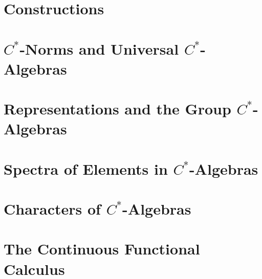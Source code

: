 \section{Constructions}%
\section{$C^{\ast}$-Norms and Universal $C^{\ast}$-Algebras}%
\section{Representations and the Group $C^{\ast}$-Algebras}%
\section{Spectra of Elements in $C^{\ast}$-Algebras}%
\section{Characters of $C^{\ast}$-Algebras}%
\section{The Continuous Functional Calculus}%

